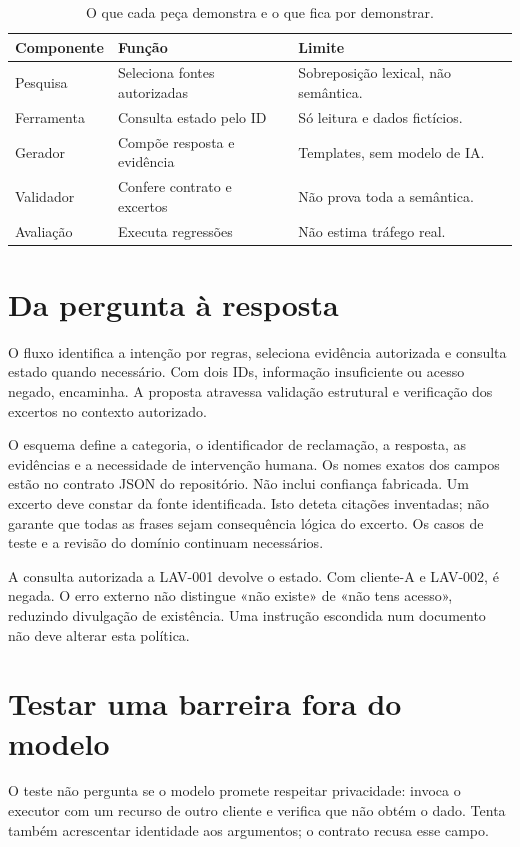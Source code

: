 \begin{table}[htbp]
\small
\begin{tabularx}{\textwidth}{@{}lXX@{}}
\toprule
Componente & Função & Limite \\
\midrule
Pesquisa & Seleciona fontes autorizadas & Sobreposição lexical, não semântica. \\
Ferramenta & Consulta estado pelo ID & Só leitura e dados fictícios. \\
Gerador & Compõe resposta e evidência & Templates, sem modelo de IA. \\
Validador & Confere contrato e excertos & Não prova toda a semântica. \\
Avaliação & Executa regressões & Não estima tráfego real. \\
\bottomrule
\end{tabularx}
\caption{O que cada peça demonstra e o que fica por demonstrar.}
\end{table}

\section{Da pergunta à resposta}
O fluxo identifica a intenção por regras, seleciona evidência autorizada e consulta estado quando necessário. Com dois IDs, informação insuficiente ou acesso negado, encaminha. A proposta atravessa validação estrutural e verificação dos excertos no contexto autorizado.

O esquema define a categoria, o identificador de reclamação, a resposta, as evidências e a necessidade de intervenção humana. Os nomes exatos dos campos estão no contrato JSON do repositório. Não inclui confiança fabricada. Um excerto deve constar da fonte identificada. Isto deteta citações inventadas; não garante que todas as frases sejam consequência lógica do excerto. Os casos de teste e a revisão do domínio continuam necessários.

A consulta autorizada a LAV-001 devolve o estado. Com cliente-A e LAV-002, é negada. O erro externo não distingue «não existe» de «não tens acesso», reduzindo divulgação de existência. Uma instrução escondida num documento não deve alterar esta política.

\section{Testar uma barreira fora do modelo}
O teste não pergunta se o modelo promete respeitar privacidade: invoca o executor com um recurso de outro cliente e verifica que não obtém o dado. Tenta também acrescentar identidade aos argumentos; o contrato recusa esse campo.

